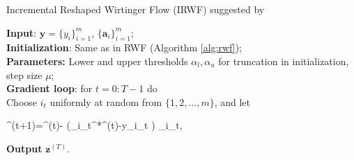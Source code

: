 	\begin{algorithm}[th]
		\caption{Incremental Reshaped Wirtinger Flow (IRWF) suggested by \cite{zhang2016reshaped}}\label{alg:irwf}
		
		\textbf{Input}: $\boldsymbol{y}=\{y_i\}_{i=1}^m$, $\{\boldsymbol{a}_i\}_{i=1}^m$; \\
		\textbf{Initialization}: Same as in RWF (Algorithm \ref{alg:rwf}); \\
		\textbf{Parameters:}  Lower and upper thresholds $\alpha_l,\alpha_u$ for  truncation in initialization, step size $\mu$;\\
		
		 \textbf{Gradient loop}: for $t=0:T-1$ do\\
		 Choose $i_t$ uniformly at random from $\{1,2,\ldots, m\}$, and let
		  \begin{flalign}
				\boldsymbol{z}^{(t+1)}=^{(t)}- \mu\left(_{i_t}^*^{(t)}-y_{i_t}\cdot{} \right) _{i_t}, \label{eq:incrementalupdate}
		\end{flalign}
		\textbf{Output} $\boldsymbol{z}^{(T)}$.
		\end{algorithm}



